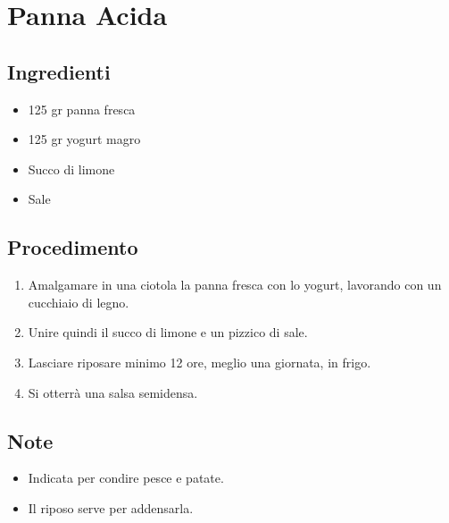\section{Panna Acida}
\subsection{Ingredienti}
\begin{itemize}
\item 125 gr panna fresca  
\item 125 gr yogurt magro  
\item Succo di limone  
\item Sale
\end{itemize}
\subsection{Procedimento}
\begin{enumerate}
\item  Amalgamare in una ciotola la panna fresca con lo yogurt, lavorando con un cucchiaio di legno.  
\item  Unire quindi il succo di limone e un pizzico di sale.  
\item  Lasciare riposare minimo 12 ore, meglio una giornata, in frigo.  
\item  Si otterrà una salsa semidensa.
\end{enumerate}
\subsection{Note}
\begin{itemize}
\item Indicata per condire pesce e patate.  
\item Il riposo serve per addensarla.
\end{itemize}

